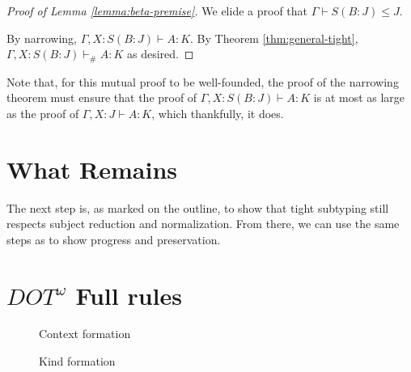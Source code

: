 \documentclass[a4paper, 10pt]{article}
\newcommand{\DOTw}{\ensuremath{DOT^\omega}}
\newcommand{\interval}[3][]{#2 .._{#1} #3}
\newcommand{\isctx}[1]{#1\ \texttt{ctx}}
\newcommand{\iskd}[1]{#1\ \texttt{kd}}
\newcommand{\TyKd}{*}
\newcommand{\KDepArr}[3]{\Pi(#1:#2).#3}
\begin{document}
\begin{proof}[Proof of Lemma \ref{lemma:beta-premise}]
  We elide a proof that $\Gamma \vdash S(B:J) \le J$.

  By narrowing, $\Gamma, X:S(B:J) \vdash A:K$. By Theorem \ref{thm:general-tight},
  $\Gamma, X:S(B:J) \vdash_\# A:K$ as desired.
\end{proof}

Note that, for this mutual proof to be well-founded, the proof of the narrowing
theorem must ensure that the proof of $\Gamma, X:S(B:J) \vdash A:K$ is at most
as large as the proof of $\Gamma, X:J \vdash A:K$, which thankfully, it does.

\section{What Remains}

The next step is, as marked on the outline, to show that tight subtyping still
respects subject reduction and normalization. From there, we can use the same
steps as \citet{rapoport2017} to show progress and preservation.

\newpage
\appendix

\section{\DOTw{} Full rules}\label{appendix:dotw-rules}

\begin{figure}[ht]
  \caption{Context formation}
\end{figure}

\begin{figure}[ht]
  \caption{Kind formation}
\end{figure}
\end{document}
